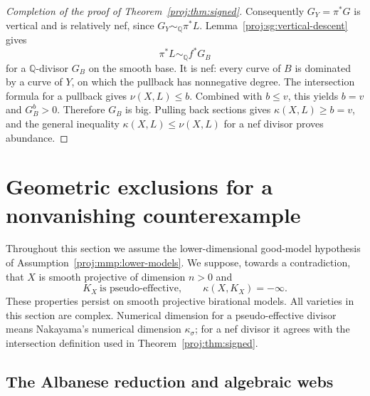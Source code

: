 \documentclass[11pt,letterpaper]{article}
\theoremstyle{definition}
\theoremstyle{remark}
\begin{document}
\begin{proof}[Completion of the proof of Theorem~\ref{proj:thm:signed}]
Consequently $G_Y=\pi^*G$ is vertical and is relatively
nef, since $G_Y\sim_{\mathbb{Q}}\pi^*L$.  Lemma~\ref{proj:sg:vertical-descent}
gives
\[
 \pi^*L\sim_{\mathbb{Q}}f^*G_B
\]
for a $\mathbb{Q}$-divisor $G_B$ on the smooth base.
It is nef: every curve of $B$ is dominated by a curve
of $Y$, on which the pullback has nonnegative degree.
The intersection formula for a pullback gives
$\nu(X,L)\le b$.  Combined with $b\le v$, this yields
$b=v$ and $G_B^b>0$.  Therefore $G_B$ is big.
Pulling back sections gives
$\kappa(X,L)\ge b=v$, and the general inequality
$\kappa(X,L)\le\nu(X,L)$ for a nef divisor proves
abundance.
\end{proof}

\section{Geometric exclusions for a nonvanishing counterexample}
\label{proj:sec:exclusions}

Throughout this section we assume the lower-dimensional good-model
hypothesis of Assumption~\ref{proj:mmp:lower-models}. We suppose, towards a
contradiction, that \(X\) is smooth projective of dimension \(n>0\) and
\begin{equation}\label{proj:ex:counterexample}
 K_X\ \text{is pseudo-effective},
 \qquad \kappa(X,K_X)=-\infty.
\end{equation}
These properties persist on smooth projective birational models. All
varieties in this section are complex. Numerical dimension for a
pseudo-effective divisor means Nakayama's numerical dimension
\(\kappa_\sigma\); for a nef divisor it agrees with the intersection
definition used in Theorem~\ref{proj:thm:signed}.

\subsection{The Albanese reduction and algebraic webs}
\end{document}
